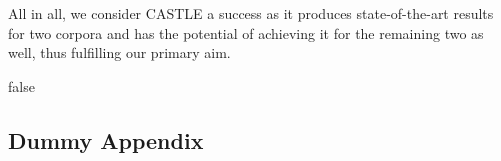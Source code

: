 \documentclass[nofilelist]{cslthse-msc}
\begin{document}
All in all, we consider CASTLE a success as it produces state-of-the-art results for two corpora and has the potential of achieving it for the remaining two as well, thus fulfilling our primary aim.  



{}

\ifx false
\begin{appendices}
\chapter{Dummy Appendix}






\printfilelist

\checkoddpage
\ifoddpage
\else
   \newpage
   \thispagestyle{empty}
   \mbox{ }
\fi

\end{appendices}
\fi
\end{document}
